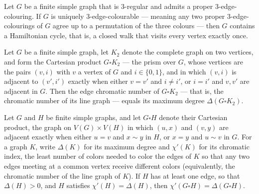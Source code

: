 \begin{theorem}
\label{SimpleGraph.isHamiltonian_of_uniquely_three_edge_colourable}
Let $G$ be a finite simple graph that is $3$-regular and admits a proper
$3$-edge-colouring. If $G$ is uniquely $3$-edge-colourable — meaning any two proper
$3$-edge-colourings of $G$ agree up to a permutation of the three colours — then $G$
contains a Hamiltonian cycle, that is, a closed walk that visits every vertex exactly
once.
\end{theorem}

\begin{theorem}
\label{SimpleGraph.edgeChromaticNumber_boxProd_completeGraph_two}
Let $G$ be a finite simple graph, let $K_2$ denote the complete graph on two vertices,
and form the Cartesian product $G \square K_2$ — the prism over $G$, whose vertices are
the pairs $(v,i)$ with $v$ a vertex of $G$ and $i \in \{0,1\}$, and in which $(v,i)$ is
adjacent to $(v',i')$ exactly when either $v = v'$ and $i \neq i'$, or $i = i'$ and
$v,v'$ are adjacent in $G$. Then the edge chromatic number of $G \square K_2$ — that is,
the chromatic number of its line graph — equals its maximum degree $\Delta(G \square
K_2)$.
\end{theorem}

\begin{theorem}
\label{SimpleGraph.edgeChromaticNumber_boxProd}
Let $G$ and $H$ be finite simple graphs, and let $G \square H$ denote their Cartesian
product, the graph on $V(G) \times V(H)$ in which $(u,x)$ and $(v,y)$ are adjacent
exactly when either $u = v$ and $x \sim y$ in $H$, or $x = y$ and $u \sim v$ in $G$. For
a graph $K$, write $\Delta(K)$ for its maximum degree and $\chi'(K)$ for its chromatic
index, the least number of colors needed to color the edges of $K$ so that any two edges
meeting at a common vertex receive different colors (equivalently, the chromatic number
of the line graph of $K$). If $H$ has at least one edge, so that $\Delta(H) > 0$, and
$H$ satisfies $\chi'(H) = \Delta(H)$, then $\chi'(G \square H) = \Delta(G \square H)$.
\end{theorem}
